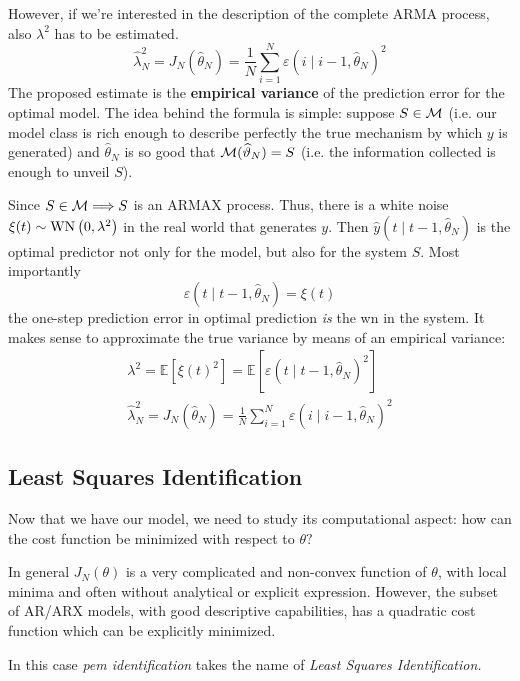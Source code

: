 However, if we're interested in the description of the complete ARMA process, also $\lambda^{2}$ has to be estimated. 
\begin{equation*}
	\boxed{\hat{\lambda }_{N}^{2} =J_{N}(\hat{\theta }_{N}) =\frac{1}{N}\sum _{i=1}^{N} \varepsilon (i\mid i-1,\hat{\theta }_{N})^{2}}
\end{equation*}
The proposed estimate is the \textbf{empirical variance} of the prediction error for the optimal model. The idea behind the formula is simple: suppose $ S\in \mathcal{M} $ (i.e. our model class is rich enough to describe perfectly the true mechanism by which $y$ is generated) and $\hat{\theta }_{N}$ is so good that $\mathcal{M}(\widehat{\vartheta }_{N}) =S$ (i.e. the information collected is enough to unveil $S$).

Since $ S\in \mathcal{M} \Longrightarrow S$ is an ARMAX process. Thus, there is a white noise $ \xi (t) \sim \operatorname{WN}\left(0,\lambda ^{2}\right)$ in the real world that generates $y$. Then $ \hat{y}(t\mid t-1,\hat{\theta }_{N})$ is the optimal predictor not only for the model, but also for the system $S$. Most importantly
\begin{equation*}
\varepsilon (t\mid t-1,\hat{\theta }_{N}) =\xi (t)
\end{equation*}
the one-step prediction error in optimal prediction \textit{is} the \gls{wn} in the system. It makes sense to approximate the true variance by means of an empirical variance:
\begin{gather*}
\lambda ^{2} =\mathbb{E}\left[ \xi (t)^{2}\right] =\mathbb{E}[ \varepsilon (t\mid t-1,\hat{\theta }_{N})^2]\\
\hat{\lambda }_{N}^{2} =J_{N}(\hat{\theta }_{N}) =\frac{1}{N}\sum _{i=1}^{N} \varepsilon (i\mid i-1,\hat{\theta }_{N})^{2}
\end{gather*}

\subsection{Least Squares Identification}
Now that we have our model, we need to study its computational aspect: how can the cost function be minimized with respect to $ \theta ?$

In general $ J_{N}(\theta)$ is a very complicated and non-convex function of $ \theta $, with local minima and often without analytical or explicit expression. However, the subset of AR/ARX models, with good descriptive capabilities, has a quadratic cost function which can be explicitly minimized.

In this case \textit{\gls{pem} identification} takes the name of \textit{Least Squares Identification.}


